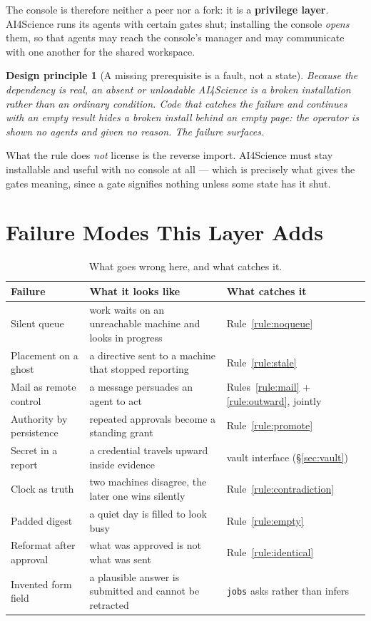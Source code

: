 \documentclass[11pt]{article}
\newtheorem{principle}{Design principle}
\newcommand{\code}[1]{\texttt{\small #1}}
\begin{document}
The console is therefore neither a peer nor a fork: it is a \textbf{privilege layer}. AI4Science runs its agents with certain gates shut; installing the console \emph{opens} them, so that agents may reach the console's manager and may communicate with one another for the shared workspace.

\begin{principle}[A missing prerequisite is a fault, not a state]
\label{prin:prereq}
Because the dependency is real, an absent or unloadable AI4Science is a broken installation rather than an ordinary condition. Code that catches the failure and continues with an empty result hides a broken install behind an empty page: the operator is shown \emph{no agents} and given no reason. The failure surfaces.
\end{principle}

What the rule does \emph{not} license is the reverse import. AI4Science must stay installable and useful with no console at all --- which is precisely what gives the gates meaning, since a gate signifies nothing unless some state has it shut.

\section{Failure Modes This Layer Adds}
\label{sec:failures}

\begin{table}[h]
\centering\small
\caption{What goes wrong here, and what catches it.}
\label{tab:failures}
\begin{tabular}{@{}L{3.8cm}L{4.8cm}L{4.4cm}@{}}
\toprule
\textbf{Failure} & \textbf{What it looks like} & \textbf{What catches it} \\
\midrule
Silent queue & work waits on an unreachable machine and looks in progress & Rule~\ref{rule:noqueue} \\
Placement on a ghost & a directive sent to a machine that stopped reporting & Rule~\ref{rule:stale} \\
Mail as remote control & a message persuades an agent to act & Rules~\ref{rule:mail} + \ref{rule:outward}, jointly \\
Authority by persistence & repeated approvals become a standing grant & Rule~\ref{rule:promote} \\
Secret in a report & a credential travels upward inside evidence & vault interface (\S\ref{sec:vault}) \\
Clock as truth & two machines disagree, the later one wins silently & Rule~\ref{rule:contradiction} \\
Padded digest & a quiet day is filled to look busy & Rule~\ref{rule:empty} \\
Reformat after approval & what was approved is not what was sent & Rule~\ref{rule:identical} \\
Invented form field & a plausible answer is submitted and cannot be retracted & \code{jobs} asks rather than infers \\
\bottomrule
\end{tabular}
\end{table}
\end{document}
